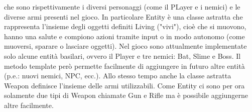 \documentclass[a4paper,12pt]{report}
\begin{document}
    che sono rispettivamente i diversi personaggi (come il PLayer e i nemici) e le diverse armi presenti nel gioco.
    In particolare Entity è una classe astratta che rappresenta l'insieme degli oggetti definiti Living ("vivi"), cioè che si muovono, hanno una salute
    e compiono azioni tramite input o in modo autonomo (come muoversi, sparare o lasciare oggetti).
    Nel gioco sono attualmente implementate solo alcune entità basilari, ovvero il Player e tre nemici: Bat, Slime e Boss. Il metodo template però permette
    facilmente di aggiungere in futuro altre entità (p.e.: nuovi nemici, NPC, ecc.).
    Allo stesso tempo anche la classe astratta Weapon definisce l'insieme delle armi utilizzabili. Come Entity ci sono per ora solamente due tipi di Weapon
    chiamate Gun e Rifle ma è possibile aggiungerne altre facilmente.
    \\
    \par
\end{document}
